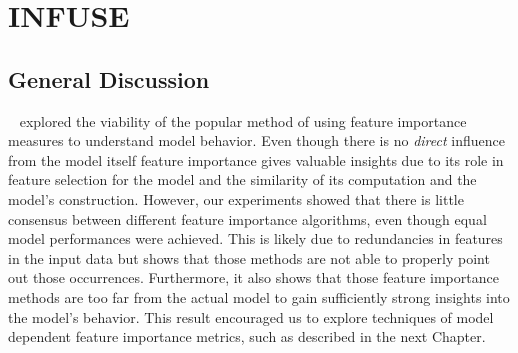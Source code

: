 \chapter{INFUSE}
\label{chap:infuse}


\section{General Discussion}
\infuse~\cite{infuse} explored the viability of the popular method of using feature importance measures to understand model behavior.
Even though there is no \emph{direct} influence from the model itself feature importance gives valuable insights due to its role in feature selection for the model and the similarity of its computation and the model's construction.
However, our experiments showed that there is little consensus between different feature importance algorithms, even though equal model performances were achieved.
This is likely due to redundancies in features in the input data but shows that those methods are not able to properly point out those occurrences.
Furthermore, it also shows that those feature importance methods are too far from the actual model to gain sufficiently strong insights into the model's behavior.
This result encouraged us to explore techniques of model dependent feature importance metrics, such as \prospector described in the next Chapter.


